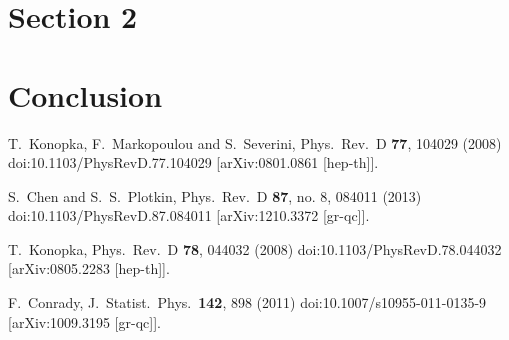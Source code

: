 \documentclass[prd,12pt,nofootinbib]{revtex4}
\begin{document}
\section{Section 2}
\section{Conclusion}  
\begin{thebibliography}{99}
  


  T.~Konopka, F.~Markopoulou and S.~Severini,
  Phys.\ Rev.\ D {\bf 77}, 104029 (2008)
  doi:10.1103/PhysRevD.77.104029
  [arXiv:0801.0861 [hep-th]].

  S.~Chen and S.~S.~Plotkin,
  Phys.\ Rev.\ D {\bf 87}, no. 8, 084011 (2013)
  doi:10.1103/PhysRevD.87.084011
  [arXiv:1210.3372 [gr-qc]].


  T.~Konopka,
  Phys.\ Rev.\ D {\bf 78}, 044032 (2008)
  doi:10.1103/PhysRevD.78.044032
  [arXiv:0805.2283 [hep-th]].

  F.~Conrady,
  J.\ Statist.\ Phys.\  {\bf 142}, 898 (2011)
  doi:10.1007/s10955-011-0135-9
  [arXiv:1009.3195 [gr-qc]].
 
\end{thebibliography}
\end{document}
